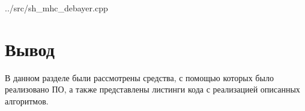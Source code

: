 \begin{lstinputlisting}[
	caption={Smooth hue transition + Malvar-He-Cutler.},
	label={lst:shmhc},
	style={cpp},
	]{../src/sh_mhc_debayer.cpp}
\end{lstinputlisting}


\section*{Вывод}

В данном разделе были рассмотрены средства, с помощью которых было реализовано ПО, а также представлены листинги кода с реализацией описанных алгоритмов.

